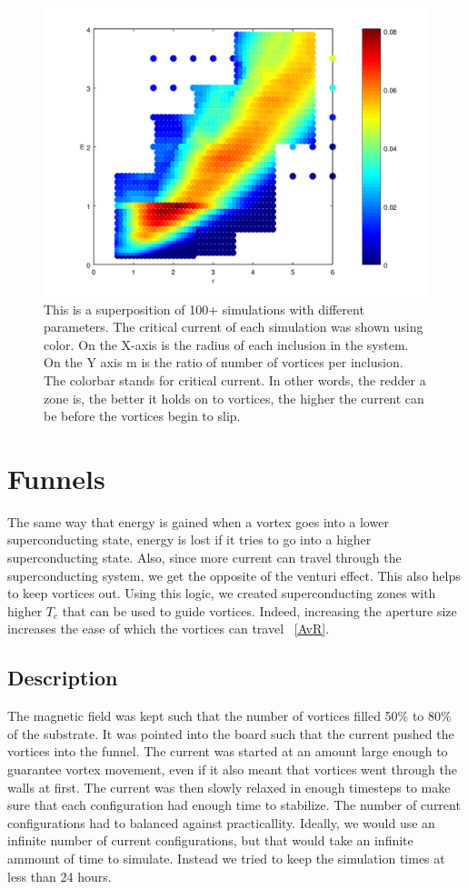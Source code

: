 \begin{figure}[htbp]
\begin{center}
\includegraphics[scale=.50]{HDFinal.png}
\caption{ This is a superposition of 100+ simulations with different parameters. The critical current of each simulation was shown using color. On the X-axis is the radius of each inclusion in the system. On the Y axis m is the ratio of number of vortices per inclusion. The colorbar stands for critical current. In other words, the redder a zone is, the better it holds on to vortices, the higher the current can be before the vortices begin to slip.}
\label{HDF}
\end{center}
\end{figure}

\section{Funnels}
The same way that energy is gained when a vortex goes into a lower superconducting state, energy is lost if it tries to go into a higher superconducting state. Also, since more current can travel through the superconducting system, we get the opposite of the venturi effect. This also helps to keep vortices out. Using this logic, we created superconducting zones with higher $T_c$ that can be used to guide vortices. Indeed, increasing the aperture size increases the ease of which the vortices can travel ~\ref{AvR}.

\subsection{Description}
The magnetic field was kept such that the number of vortices filled 50\% to 80\% of the substrate. It was pointed into the board such that the current pushed the vortices into the funnel. The current was started at an amount large enough to guarantee vortex movement, even if it also meant that vortices went through the walls at first. The current was then slowly relaxed in enough timesteps to make sure that each configuration had enough time to stabilize. The number of current configurations had to balanced against practicallity. Ideally, we would use an infinite number of current configurations, but that would take an infinite ammount of time to simulate. Instead we tried to keep the simulation times at less than 24 hours.

